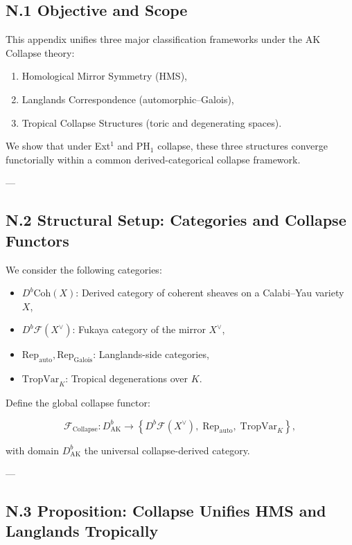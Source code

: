 \documentclass[11pt]{article}
\begin{document}
\subsection*{N.1 Objective and Scope}

This appendix unifies three major classification frameworks under the AK Collapse theory:

\begin{enumerate}
  \item Homological Mirror Symmetry (HMS),
  \item Langlands Correspondence (automorphic–Galois),
  \item Tropical Collapse Structures (toric and degenerating spaces).
\end{enumerate}

We show that under Ext$^1$ and PH$_1$ collapse, these three structures converge functorially within a common derived-categorical collapse framework.

---

\subsection*{N.2 Structural Setup: Categories and Collapse Functors}

We consider the following categories:

\begin{itemize}
  \item $D^b\mathrm{Coh}(X)$: Derived category of coherent sheaves on a Calabi–Yau variety $X$,
  \item $D^b\mathcal{F}(X^\vee)$: Fukaya category of the mirror $X^\vee$,
  \item $\mathrm{Rep}_\mathrm{auto}, \mathrm{Rep}_\mathrm{Galois}$: Langlands-side categories,
  \item $\mathrm{TropVar}_K$: Tropical degenerations over $K$.
\end{itemize}

Define the global collapse functor:

\[
\mathcal{F}_{\mathrm{Collapse}} : D^b_{\mathrm{AK}} \to \left\{
D^b\mathcal{F}(X^\vee),\;
\mathrm{Rep}_\mathrm{auto},\;
\mathrm{TropVar}_K
\right\},
\]

with domain $D^b_{\mathrm{AK}}$ the universal collapse-derived category.

---

\subsection*{N.3 Proposition: Collapse Unifies HMS and Langlands Tropically}
\end{document}
